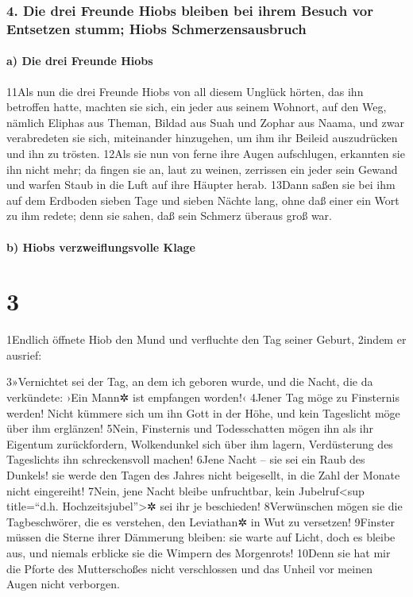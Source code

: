 \hypertarget{die-drei-freunde-hiobs-bleiben-bei-ihrem-besuch-vor-entsetzen-stumm-hiobs-schmerzensausbruch}{%
\subsubsection{4. Die drei Freunde Hiobs bleiben bei ihrem Besuch vor
Entsetzen stumm; Hiobs
Schmerzensausbruch}\label{die-drei-freunde-hiobs-bleiben-bei-ihrem-besuch-vor-entsetzen-stumm-hiobs-schmerzensausbruch}}

\hypertarget{a-die-drei-freunde-hiobs}{%
\paragraph{a) Die drei Freunde Hiobs}\label{a-die-drei-freunde-hiobs}}

11Als nun die drei Freunde Hiobs von all diesem Unglück hörten, das ihn
betroffen hatte, machten sie sich, ein jeder aus seinem Wohnort, auf den
Weg, nämlich Eliphas aus Theman, Bildad aus Suah und Zophar aus Naama,
und zwar verabredeten sie sich, miteinander hinzugehen, um ihm ihr
Beileid auszudrücken und ihn zu trösten. 12Als sie nun von ferne ihre
Augen aufschlugen, erkannten sie ihn nicht mehr; da fingen sie an, laut
zu weinen, zerrissen ein jeder sein Gewand und warfen Staub in die Luft
auf ihre Häupter herab. 13Dann saßen sie bei ihm auf dem Erdboden sieben
Tage und sieben Nächte lang, ohne daß einer ein Wort zu ihm redete; denn
sie sahen, daß sein Schmerz überaus groß war.

\hypertarget{b-hiobs-verzweiflungsvolle-klage}{%
\paragraph{b) Hiobs verzweiflungsvolle
Klage}\label{b-hiobs-verzweiflungsvolle-klage}}

\hypertarget{section-2}{%
\section{3}\label{section-2}}

1Endlich öffnete Hiob den Mund und verfluchte den Tag seiner Geburt,
2indem er ausrief:

3»Vernichtet sei der Tag, an dem ich geboren wurde, und die Nacht, die
da verkündete: ›Ein Mann✲ ist empfangen worden!‹ 4Jener Tag möge zu
Finsternis werden! Nicht kümmere sich um ihn Gott in der Höhe, und kein
Tageslicht möge über ihm erglänzen! 5Nein, Finsternis und Todesschatten
mögen ihn als ihr Eigentum zurückfordern, Wolkendunkel sich über ihm
lagern, Verdüsterung des Tageslichts ihn schreckensvoll machen! 6Jene
Nacht -- sie sei ein Raub des Dunkels! sie werde den Tagen des Jahres
nicht beigesellt, in die Zahl der Monate nicht eingereiht! 7Nein, jene
Nacht bleibe unfruchtbar, kein Jubelruf\textless sup title=``d.h.
Hochzeitsjubel''\textgreater✲ sei ihr je beschieden! 8Verwünschen mögen
sie die Tagbeschwörer, die es verstehen, den Leviathan✲ in Wut zu
versetzen! 9Finster müssen die Sterne ihrer Dämmerung bleiben: sie warte
auf Licht, doch es bleibe aus, und niemals erblicke sie die Wimpern des
Morgenrots! 10Denn sie hat mir die Pforte des Mutterschoßes nicht
verschlossen und das Unheil vor meinen Augen nicht verborgen.

